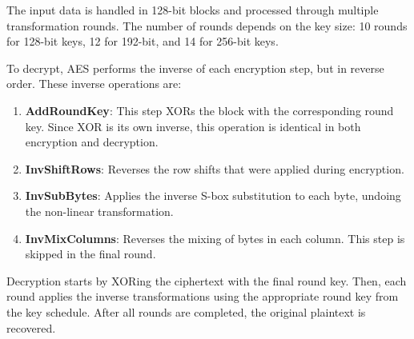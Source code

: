 The input data is handled in 128-bit blocks and processed through multiple transformation rounds. The number of rounds depends on the key size: 10 rounds for 128-bit keys, 12 for 192-bit, and 14 for 256-bit keys.

To decrypt, AES performs the inverse of each encryption step, but in reverse order. These inverse operations are:

\begin{enumerate}
    \item \textbf{AddRoundKey}: This step XORs the block with the corresponding round key. Since XOR is its own inverse, this operation is identical in both encryption and decryption.
    \item \textbf{InvShiftRows}: Reverses the row shifts that were applied during encryption.
    \item \textbf{InvSubBytes}: Applies the inverse S-box substitution to each byte, undoing the non-linear transformation.
    \item \textbf{InvMixColumns}: Reverses the mixing of bytes in each column. This step is skipped in the final round.
\end{enumerate}

Decryption starts by XORing the ciphertext with the final round key. Then, each round applies the inverse transformations using the appropriate round key from the key schedule. After all rounds are completed, the original plaintext is recovered.
